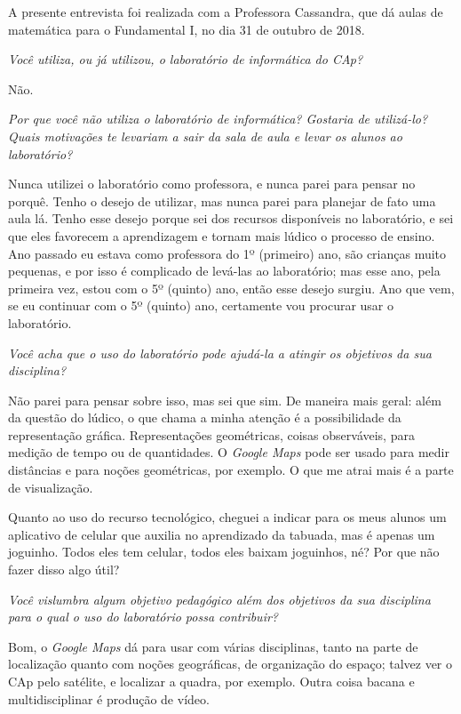 A presente entrevista foi realizada com a Professora Cassandra, que dá aulas de matemática para o Fundamental I, no dia 31 de outubro de 2018.

\textit{Você utiliza, ou já utilizou, o laboratório de informática do CAp?}

Não.

\textit{Por que você não utiliza o laboratório de informática? Gostaria de utilizá-lo? Quais motivações te levariam a sair da sala de aula e levar os alunos ao laboratório?}

Nunca utilizei o laboratório como professora, e nunca parei para pensar no porquê. Tenho o desejo de utilizar, mas nunca parei para planejar de fato uma aula lá. Tenho esse desejo porque sei dos recursos disponíveis no laboratório, e sei que eles favorecem a aprendizagem e tornam mais lúdico o processo de ensino. Ano passado eu estava como professora do 1º (primeiro) ano, são crianças muito pequenas, e por isso é complicado de levá-las ao laboratório; mas esse ano, pela primeira vez, estou com o 5º (quinto) ano, então esse desejo surgiu. Ano que vem, se eu continuar com o 5º (quinto) ano, certamente vou procurar usar o laboratório.

\textit{Você acha que o uso do laboratório pode ajudá-la a atingir os objetivos da sua disciplina?}

Não parei para pensar sobre isso, mas sei que sim. De maneira mais geral: além da questão do lúdico, o que chama a minha atenção é a possibilidade da representação gráfica. Representações geométricas, coisas observáveis, para medição de tempo ou de quantidades. O \textit{Google Maps} pode ser usado para medir distâncias e para noções geométricas, por exemplo. O que me atrai mais é a parte de visualização.

Quanto ao uso do recurso tecnológico, cheguei a indicar para os meus alunos um aplicativo de celular que auxilia no aprendizado da tabuada, mas é apenas um joguinho. Todos eles tem celular, todos eles baixam joguinhos, né? Por que não fazer disso algo útil?

\textit{Você vislumbra algum objetivo pedagógico além dos objetivos da sua disciplina para o qual o uso do laboratório possa contribuir?}

Bom, o \textit{Google Maps} dá para usar com várias disciplinas, tanto na parte de localização quanto com noções geográficas, de organização do espaço; talvez ver o CAp pelo satélite, e localizar a quadra, por exemplo. Outra coisa bacana e multidisciplinar é produção de vídeo.

